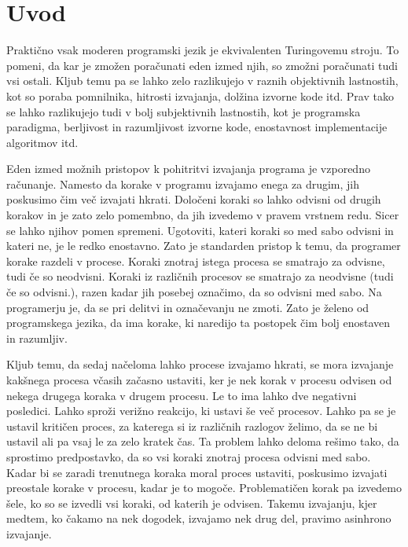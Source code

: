\section{Uvod} \label{sec:uvod}


Praktično vsak moderen programski jezik je ekvivalenten Turingovemu stroju. To pomeni, da kar je zmožen poračunati eden izmed njih, so zmožni poračunati tudi vsi ostali. Kljub temu pa se lahko zelo razlikujejo v raznih objektivnih lastnostih, kot so poraba pomnilnika, hitrosti izvajanja, dolžina izvorne kode itd. Prav tako se lahko razlikujejo tudi v bolj subjektivnih lastnostih, kot je programska paradigma, berljivost in razumljivost izvorne kode, enostavnost implementacije algoritmov itd.

Eden izmed možnih pristopov k pohitritvi izvajanja programa je vzporedno računanje. Namesto da korake v programu izvajamo enega za drugim, jih poskusimo čim več izvajati hkrati. Določeni koraki so lahko odvisni od drugih korakov in je zato zelo pomembno, da jih izvedemo v pravem vrstnem redu. Sicer se lahko njihov pomen spremeni. Ugotoviti, kateri koraki so med sabo odvisni in kateri ne, je le redko enostavno. Zato je standarden pristop k temu, da programer korake razdeli v procese. Koraki znotraj istega procesa se smatrajo za odvisne, tudi če so neodvisni. Koraki iz različnih procesov se smatrajo za neodvisne (tudi če so odvisni.), razen kadar jih posebej označimo, da so odvisni med sabo.
Na programerju je, da se pri delitvi in označevanju ne zmoti. Zato je želeno od programskega jezika, da ima korake, ki naredijo ta postopek čim bolj enostaven in razumljiv.

Kljub temu, da sedaj načeloma lahko procese izvajamo hkrati, se mora izvajanje kakšnega procesa včasih začasno ustaviti, ker je nek korak v procesu odvisen od nekega drugega koraka v drugem procesu. Le to ima lahko dve negativni posledici. Lahko sproži verižno reakcijo, ki ustavi še več procesov. Lahko pa se je ustavil kritičen proces, za katerega si iz različnih razlogov želimo, da se ne bi ustavil ali pa vsaj le za zelo kratek čas.
Ta problem lahko deloma rešimo tako, da sprostimo predpostavko, da so vsi koraki znotraj procesa odvisni med sabo. Kadar bi se zaradi trenutnega koraka moral proces ustaviti, poskusimo izvajati preostale korake v procesu, kadar je to mogoče. Problematičen korak pa izvedemo šele, ko so se izvedli vsi koraki, od katerih je odvisen. Takemu izvajanju, kjer medtem, ko čakamo na nek dogodek, izvajamo nek drug del, pravimo asinhrono izvajanje. 

